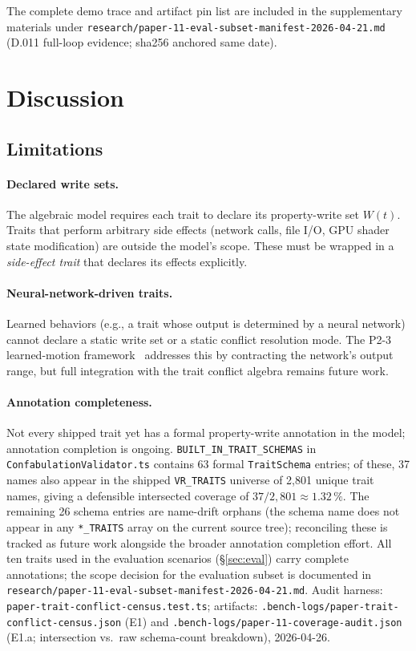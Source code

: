 \documentclass[sigconf,nonacm]{acmart}
\begin{document}
The complete demo trace and artifact pin list are included in the
supplementary materials under
\texttt{research/paper-11-eval-subset-manifest-2026-04-21.md}
(D.011 full-loop evidence; sha256 anchored same date).

\section{Discussion}
\label{sec:discussion}

\subsection{Limitations}

\paragraph{Declared write sets.}
The algebraic model requires each trait to declare its
property-write set $W(t)$. Traits that perform arbitrary
side effects (network calls, file I/O, GPU shader state
modification) are outside the model's scope. These must be
wrapped in a \emph{side-effect trait} that declares its
effects explicitly.

\paragraph{Neural-network-driven traits.}
Learned behaviors (e.g., a trait whose output is determined
by a neural network) cannot declare a static write set or a
static conflict resolution mode. The P2-3 learned-motion
framework~\cite{paper-9-motion-asia2027} addresses this by
contracting the network's output range, but full integration
with the trait conflict algebra remains future work.

\paragraph{Annotation completeness.}
Not every shipped trait yet has a formal property-write
annotation in the model; annotation completion is ongoing.
\texttt{BUILT\_IN\_TRAIT\_SCHEMAS} in
\texttt{ConfabulationValidator.ts} contains 63 formal
\texttt{TraitSchema} entries; of these, 37 names also appear
in the shipped \texttt{VR\_TRAITS} universe of 2{,}801 unique
trait names, giving a defensible intersected coverage of
\(37/2{,}801 \approx 1.32\,\%\). The remaining 26 schema
entries are name-drift orphans (the schema name does not
appear in any \texttt{*\_TRAITS} array on the current source
tree); reconciling these is tracked as future work
alongside the broader annotation completion effort.
All ten traits used in the evaluation scenarios
(\S\ref{sec:eval}) carry complete annotations; the scope
decision for the evaluation subset is documented in
\texttt{research/paper-11-eval-subset-manifest-2026-04-21.md}.
Audit harness:
\texttt{paper-trait-conflict-census.test.ts}; artifacts:
\texttt{.bench-logs/paper-trait-conflict-census.json} (E1) and
\texttt{.bench-logs/paper-11-coverage-audit.json} (E1.a;
intersection vs.\ raw schema-count breakdown), 2026-04-26.
\end{document}
